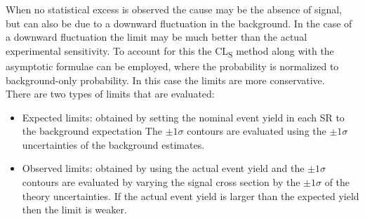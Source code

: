 When no statistical excess is observed the cause may be the absence of signal, but can also be due to a downward fluctuation in the background.  In the case of a downward fluctuation the limit may be much better than the actual experimental sensitivity.  To account for this the CL\textsubscript{S} method\cite{CLs1, CLs2} along with the asymptotic formulae\cite{likelihoodFit} can be employed, where the probability is normalized to background-only probability.  In this case the limits are more conservative. \\ %



There are two types of limits that are evaluated: 

\begin{itemize}
\item Expected limits: obtained by setting the nominal event yield in each SR to the background expectation The $\pm 1 \sigma$ contours are evaluated using the  $\pm 1 \sigma$ uncertainties of the background estimates.
\item Observed limits: obtained by using the actual event yield and the $\pm 1 \sigma$ contours are evaluated by varying the signal cross section by the $\pm 1 \sigma$ of the theory uncertainties.  If the actual event yield is larger than the expected yield then the limit is weaker.
\end{itemize}



